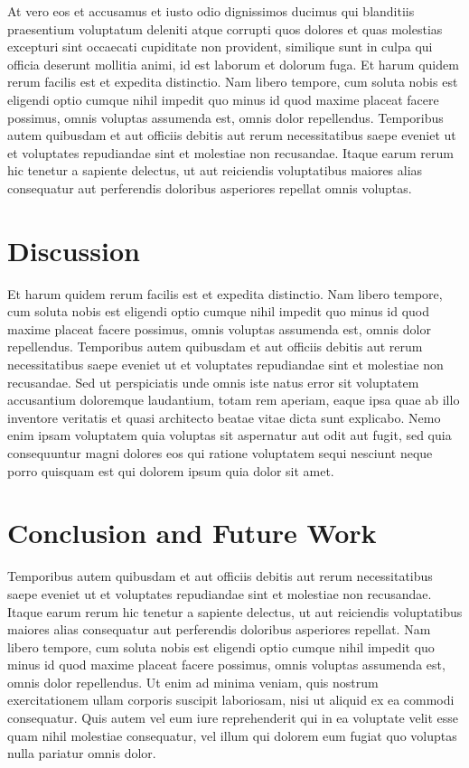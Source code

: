 At vero eos et accusamus et iusto odio dignissimos ducimus qui
blanditiis praesentium voluptatum deleniti atque corrupti quos dolores
et quas molestias excepturi sint occaecati cupiditate non provident,
similique sunt in culpa qui officia deserunt mollitia animi, id est
laborum et dolorum fuga. Et harum quidem rerum facilis est et expedita
distinctio. Nam libero tempore, cum soluta nobis est eligendi optio
cumque nihil impedit quo minus id quod maxime placeat facere possimus,
omnis voluptas assumenda est, omnis dolor repellendus. Temporibus autem
quibusdam et aut officiis debitis aut rerum necessitatibus saepe
eveniet ut et voluptates repudiandae sint et molestiae non recusandae.
Itaque earum rerum hic tenetur a sapiente delectus, ut aut reiciendis
voluptatibus maiores alias consequatur aut perferendis doloribus
asperiores repellat omnis voluptas.

\section{Discussion}

Et harum quidem rerum facilis est et expedita distinctio. Nam libero
tempore, cum soluta nobis est eligendi optio cumque nihil impedit quo
minus id quod maxime placeat facere possimus, omnis voluptas assumenda
est, omnis dolor repellendus. Temporibus autem quibusdam et aut officiis
debitis aut rerum necessitatibus saepe eveniet ut et voluptates
repudiandae sint et molestiae non recusandae. Sed ut perspiciatis unde
omnis iste natus error sit voluptatem accusantium doloremque
laudantium, totam rem aperiam, eaque ipsa quae ab illo inventore
veritatis et quasi architecto beatae vitae dicta sunt explicabo. Nemo
enim ipsam voluptatem quia voluptas sit aspernatur aut odit aut fugit,
sed quia consequuntur magni dolores eos qui ratione voluptatem sequi
nesciunt neque porro quisquam est qui dolorem ipsum quia dolor sit amet.

\section{Conclusion and Future Work}

Temporibus autem quibusdam et aut officiis debitis aut rerum
necessitatibus saepe eveniet ut et voluptates repudiandae sint et
molestiae non recusandae. Itaque earum rerum hic tenetur a sapiente
delectus, ut aut reiciendis voluptatibus maiores alias consequatur aut
perferendis doloribus asperiores repellat. Nam libero tempore, cum
soluta nobis est eligendi optio cumque nihil impedit quo minus id quod
maxime placeat facere possimus, omnis voluptas assumenda est, omnis
dolor repellendus. Ut enim ad minima veniam, quis nostrum
exercitationem ullam corporis suscipit laboriosam, nisi ut aliquid ex
ea commodi consequatur. Quis autem vel eum iure reprehenderit qui in ea
voluptate velit esse quam nihil molestiae consequatur, vel illum qui
dolorem eum fugiat quo voluptas nulla pariatur omnis dolor.
